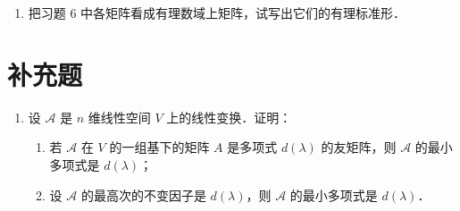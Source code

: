 \begin{enumerate}
  \item 把习题 6 中各矩阵看成有理数域上矩阵，试写出它们的有理标准形．
  \anscompute
\end{enumerate}

\section{补充题}

\begin{enumerate}
  \item 设 $\mathcal{A}$ 是 $n$ 维线性空间 $V$ 上的线性变换．证明：
  \begin{enumerate}
    \item 若 $\mathcal{A}$ 在 $V$ 的一组基下的矩阵 $A$ 是多项式 $d(\lambda)$ 的友矩阵，则 $\mathcal{A}$ 的最小多项式是 $d(\lambda)$；
  \anssub
    \item 设 $\mathcal{A}$ 的最高次的不变因子是 $d(\lambda)$，则 $\mathcal{A}$ 的最小多项式是 $d(\lambda)$．
  \anssub
  \end{enumerate}
\end{enumerate}
